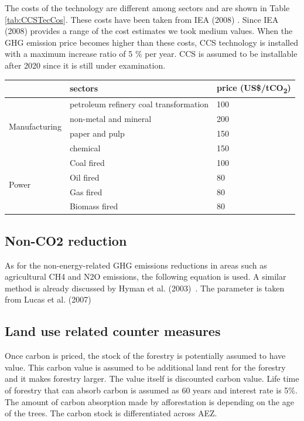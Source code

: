 \documentclass[10pt,a4paper,titlepage,dvipdfmx]{book}
\begin{document}
The costs of the technology are different among sectors and are shown in Table \ref{tab:CCSTecCos}. These costs have been taken from IEA (2008) \cite{RN2115}. Since IEA (2008)\cite{RN2115} provides a range of the cost estimates we took medium values. When the GHG emission price becomes higher than these costs, CCS technology is installed with a maximum increase ratio of 5 \% per year. CCS is assumed to be installable after 2020 since it is still under examination.


\begin{tabularx}{\textwidth}{|
p{}|
p{}|
p{}|} 
\caption{\label{tab:CCSTecCos}CCS technology cost}\\
\hline 
 & sectors & price (US\$/tCO\textsubscript{2}) \\\hline 
\multirow{4}{=}{Manufacturing}  & petroleum refinery coal transformation & 100 \\\cline{2-3}
 & non-metal and mineral & 200 \\\cline{2-3}
 & paper and pulp & 150 \\\cline{2-3}
 & chemical & 150 \\\hline 
\multirow{4}{=}{Power}  & Coal fired & 100 \\\cline{2-3}
 & Oil fired & 80 \\\cline{2-3}
 & Gas fired  & 80 \\\cline{2-3}
 & Biomass fired & 80 \\\hline 
\end{tabularx}

\subsection{\label{subsec:NonCO2Red}{Non-CO2 reduction}}

As for the non-energy-related GHG emissions reductions in areas such as agricultural CH4 and N2O emissions, the following equation is used. A similar method is already discussed by Hyman et al. (2003)~\cite{RN2134}. The parameter is taken from Lucas et al. (2007)~\cite{RN2282}

\subsection{\label{subsec:LanUseRelCouMea}Land use related counter measures}

Once carbon is priced, the stock of the forestry is potentially assumed to have value. This carbon value is assumed to be additional land rent for the forestry and it makes forestry larger. The value itself is discounted carbon value. Life time of forestry that can absorb carbon is assumed as 60 years and interest rate is 5\%. The amount of carbon absorption made by afforestation is depending on the age of the trees. The carbon stock is differentiated across AEZ.
\end{document}

